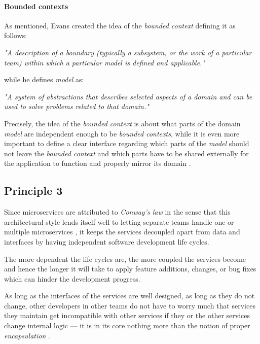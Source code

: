 \documentclass[12pt,a4paper]{report}
\begin{document}
\paragraph{Bounded contexts}
As mentioned, Evans created the idea of the \textit{bounded context} defining
it as follows:
\begin{displayquote}
\emph{"A description of a boundary
(typically a subsystem, or the work of a particular team)
within which a particular model is defined and applicable."}~\cite{evans2014ddd}
\end{displayquote}
while he defines \textit{model} as:
\begin{displayquote}
\emph{"A system of abstractions that describes selected aspects of a domain
and can be used to solve problems related to that domain."}~\cite{evans2014ddd}
\end{displayquote}
Precisely, the idea of the \textit{bounded context} is about what parts of the
domain \textit{model} are independent enough to be \textit{bounded contexts},
while it is even more important to define a clear interface regarding
which parts of the \textit{model} should not leave the \textit{bounded context}
and which parts have to be shared externally for the application to function
and properly mirror its domain \cite{newman2015building}.


\subsection{Principle 3}
Since microservices are attributed to \textit{Conway's law}
\cite{ms-fowler, dragoni2017microservices, conway1968law}
in the sense that this architectural style lends itself well to letting
separate teams handle one or multiple microservices \cite{newman2015building},
it keeps the services decoupled apart from data and interfaces by having
independent software development life cycles.

The more dependent the life cycles are, the more coupled the services become
and hence the longer it will take to apply feature additions, changes,
or bug fixes which can hinder the development progress.

As long as the interfaces of the services are well designed,
as long as they do not change, other developers in other teams do not have
to worry much that services they maintain get incompatible with other services
if they or the other services change internal logic --- it is in its core
nothing more than the notion of proper \textit{encapsulation} \cite{ms-fowler}.
\end{document}
